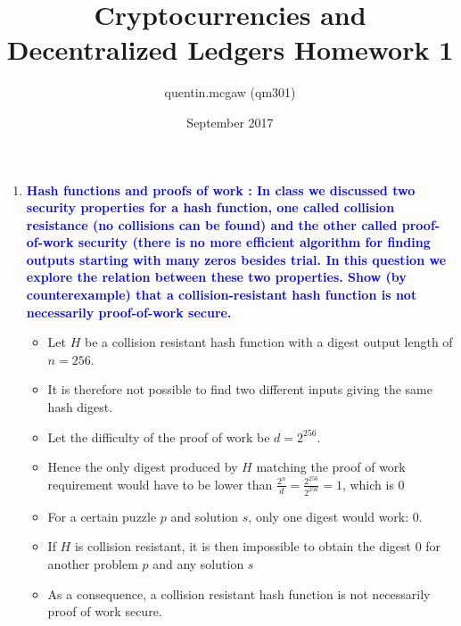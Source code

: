 \documentclass[11pt]{article}
\title{Cryptocurrencies and Decentralized Ledgers Homework 1}
\author{quentin.mcgaw (qm301)}
\date{September 2017}
\begin{document}
\maketitle

\begin{enumerate}

\item \textbf{\textcolor{blue}{Hash functions and proofs of work : In class we discussed two security properties for a hash function, one called collision resistance (no collisions can be found) and the other called proof-of-work security (there is no more efficient algorithm for finding outputs starting with many zeros besides trial. In this question we explore the relation between these two properties. Show (by counterexample) that a collision-resistant hash function is not necessarily proof-of-work secure.}}
\begin{itemize}
    \item Let $H$ be a collision resistant hash function with a digest output length of $n = 256$.
    \item It is therefore not possible to find two different inputs giving the same hash digest.
    \item Let the difficulty of the proof of work be $d = 2^{256}$.
    \item Hence the only digest produced by $H$ matching the proof of work requirement would have to be lower than $\frac{2^{n}}{d} = \frac{2^{256}}{2^{256}} = 1$, which is $0$
    \item For a certain puzzle $p$ and solution $s$, only one digest would work: $0$.
    \item If $H$ is collision resistant, it is then impossible to obtain the digest $0$ for another problem $p$ and any solution $s$
    \item As a consequence, a collision resistant hash function is not necessarily proof of work secure.
\end{itemize}


\end{enumerate}
\end{document}
